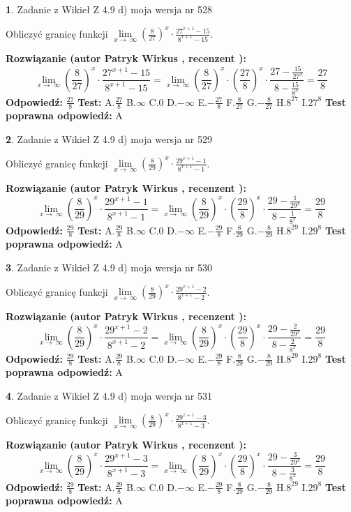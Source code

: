 \documentclass[12pt, a4paper]{article}
\theoremstyle{definition} %
\newtheorem{zad}{}
\newcommand{\zadStart}[1]{\begin{zad}#1\newline}
\newcommand{\zadStop}{\end{zad}}
\newcommand{\rozwStart}[2]{\noindent \textbf{Rozwiązanie (autor #1 , recenzent #2): }\newline}
\newcommand{\rozwStop}{\newline}
\newcommand{\odpStart}{\noindent \textbf{Odpowiedź:}\newline}
\newcommand{\odpStop}{\newline}
\newcommand{\testStart}{\noindent \textbf{Test:}\newline}
\newcommand{\testStop}{\newline}
\newcommand{\kluczStart}{\noindent \textbf{Test poprawna odpowiedź:}\newline}
\newcommand{\kluczStop}{\newline}
\begin{document}
\zadStart{Zadanie z Wikieł Z 4.9 d) moja wersja nr 528}


Obliczyć granicę funkcji  $\lim\limits_{x\to\ \infty}(\frac{8}{27})^{x}\cdot\frac{27^{x+1}-15}{8^{x+1}-15}$.
\zadStop
\rozwStart{Patryk Wirkus}{}
$$\lim\limits_{x\to\ \infty}(\frac{8}{27})^{x}\cdot\frac{27^{x+1}-15}{8^{x+1}-15}=\lim\limits_{x\to\ \infty}(\frac{8}{27})^{x}\cdot(\frac{27}{8})^{x} \cdot \frac{27-\frac{15}{27^{x}}}{8-\frac{15}{8^{x}}} = \frac{27}{8}$$
\rozwStop
\odpStart
$\frac{27}{8}$
\odpStop
\testStart
A.$\frac{27}{8}$ B.$\infty$ C.$0$ D.$-\infty$ E.$-\frac{27}{8}$
F.$\frac{8}{27}$ G.$-\frac{8}{27}$
H.$8^{27}$
I.$27^{8}$
\testStop
\kluczStart
A
\kluczStop



\zadStart{Zadanie z Wikieł Z 4.9 d) moja wersja nr 529}


Obliczyć granicę funkcji  $\lim\limits_{x\to\ \infty}(\frac{8}{29})^{x}\cdot\frac{29^{x+1}-1}{8^{x+1}-1}$.
\zadStop
\rozwStart{Patryk Wirkus}{}
$$\lim\limits_{x\to\ \infty}(\frac{8}{29})^{x}\cdot\frac{29^{x+1}-1}{8^{x+1}-1}=\lim\limits_{x\to\ \infty}(\frac{8}{29})^{x}\cdot(\frac{29}{8})^{x} \cdot \frac{29-\frac{1}{29^{x}}}{8-\frac{1}{8^{x}}} = \frac{29}{8}$$
\rozwStop
\odpStart
$\frac{29}{8}$
\odpStop
\testStart
A.$\frac{29}{8}$ B.$\infty$ C.$0$ D.$-\infty$ E.$-\frac{29}{8}$
F.$\frac{8}{29}$ G.$-\frac{8}{29}$
H.$8^{29}$
I.$29^{8}$
\testStop
\kluczStart
A
\kluczStop



\zadStart{Zadanie z Wikieł Z 4.9 d) moja wersja nr 530}


Obliczyć granicę funkcji  $\lim\limits_{x\to\ \infty}(\frac{8}{29})^{x}\cdot\frac{29^{x+1}-2}{8^{x+1}-2}$.
\zadStop
\rozwStart{Patryk Wirkus}{}
$$\lim\limits_{x\to\ \infty}(\frac{8}{29})^{x}\cdot\frac{29^{x+1}-2}{8^{x+1}-2}=\lim\limits_{x\to\ \infty}(\frac{8}{29})^{x}\cdot(\frac{29}{8})^{x} \cdot \frac{29-\frac{2}{29^{x}}}{8-\frac{2}{8^{x}}} = \frac{29}{8}$$
\rozwStop
\odpStart
$\frac{29}{8}$
\odpStop
\testStart
A.$\frac{29}{8}$ B.$\infty$ C.$0$ D.$-\infty$ E.$-\frac{29}{8}$
F.$\frac{8}{29}$ G.$-\frac{8}{29}$
H.$8^{29}$
I.$29^{8}$
\testStop
\kluczStart
A
\kluczStop



\zadStart{Zadanie z Wikieł Z 4.9 d) moja wersja nr 531}


Obliczyć granicę funkcji  $\lim\limits_{x\to\ \infty}(\frac{8}{29})^{x}\cdot\frac{29^{x+1}-3}{8^{x+1}-3}$.
\zadStop
\rozwStart{Patryk Wirkus}{}
$$\lim\limits_{x\to\ \infty}(\frac{8}{29})^{x}\cdot\frac{29^{x+1}-3}{8^{x+1}-3}=\lim\limits_{x\to\ \infty}(\frac{8}{29})^{x}\cdot(\frac{29}{8})^{x} \cdot \frac{29-\frac{3}{29^{x}}}{8-\frac{3}{8^{x}}} = \frac{29}{8}$$
\rozwStop
\odpStart
$\frac{29}{8}$
\odpStop
\testStart
A.$\frac{29}{8}$ B.$\infty$ C.$0$ D.$-\infty$ E.$-\frac{29}{8}$
F.$\frac{8}{29}$ G.$-\frac{8}{29}$
H.$8^{29}$
I.$29^{8}$
\testStop
\kluczStart
A
\kluczStop
\end{document}
